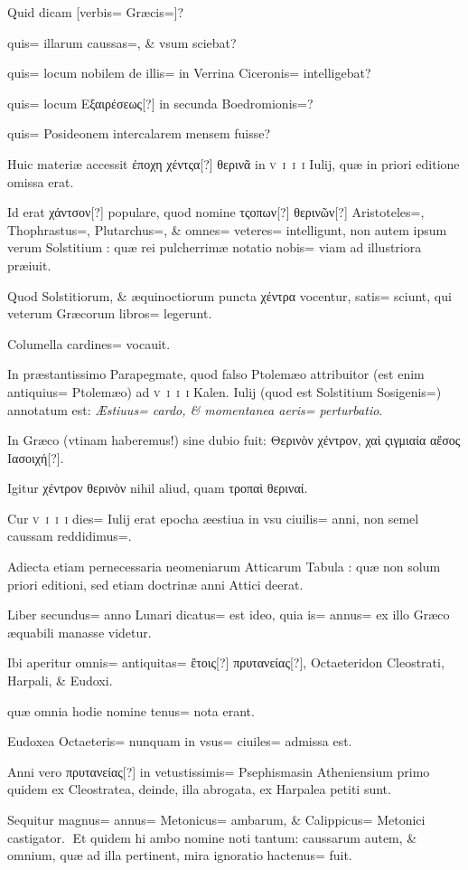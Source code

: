 \begin{parnumbers}
Quid dicam [verbis= Græcis=]?

quis= illarum caussas=, \& vsum sciebat?

quis= locum nobilem de illis= in Verrina Ciceronis= intelligebat?

quis= locum Εξαιρέσεως[?] in secunda Boedromionis=?

quis= Posideonem intercalarem mensem fuisse?

Huic materiæ accessit ἐποχη χέντςα[?] θερινᾶ in \textsc{v~i~i~i} Iulij, quæ in priori editione omissa erat.

Id erat χάντσον[?] populare, quod nomine τςοπων[?] θερινῶν[?] Aristoteles=, Thophrastus=, Plutarchus=, \& omnes= veteres= intelligunt, non autem ipsum verum Solstitium : quæ rei pulcherrimæ notatio nobis= viam ad illustriora præiuit.

Quod Solstitiorum, \& æquinoctiorum puncta χέντρα vocentur, satis= sciunt, qui veterum Græcorum libros= legerunt.

Columella cardines= vocauit.

In præstantissimo Parapegmate, quod falso Ptolemæo attribuitor (est enim antiquius= Ptolemæo) ad \textsc{v~i~i~i} Kalen. Iulij (quod est Solstitium Sosigenis=) annotatum est: \textit{Æstiuus= cardo, \& momentanea aeris= perturbatio}.

In Græco (vtinam haberemus!) sine dubio fuit: Θερινὸν χέντρον, χαὶ ςιγμιαία αἔσος Ιασοιχή[?].

Igitur χέντρον θερινὸν nihil aliud, quam τροπαὶ θεριναί.

Cur \textsc{v~i~i~i} dies= Iulij erat epocha æestiua in vsu ciuilis= anni, non semel caussam reddidimus=. 

Adiecta etiam pernecessaria neomeniarum Atticarum Tabula : quæ non solum priori editioni, sed etiam doctrinæ anni Attici deerat.

Liber secundus= anno Lunari dicatus= est ideo, quia is= annus= ex illo Græco æquabili manasse videtur.

Ibi aperitur omnis= antiquitas= ἔτοις[?] πρυτανείας[?], Octaeteridon Cleostrati, Harpali, \& Eudoxi.

quæ omnia hodie nomine tenus= nota erant.

Eudoxea Octaeteris= nunquam in vsus= ciuiles= admissa est.

Anni vero πρυτανείας[?] in vetustissimis= Psephismasin Atheniensium primo quidem ex Cleostratea, deinde, illa abrogata, ex Harpalea petiti sunt.

Sequitur magnus= annus= Metonicus=
ambarum, \& Calippicus= Metonici castigator.
Et quidem hi ambo nomine noti tantum: caussarum autem, \& omnium, quæ ad illa pertinent, mira ignoratio hactenus= fuit.


\end{parnumbers}
